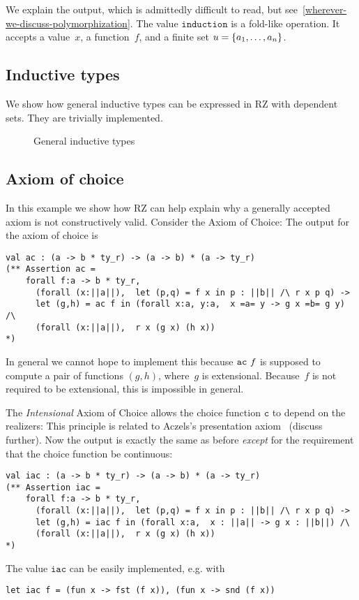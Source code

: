 %
We explain the output, which is admittedly difficult to read, but
see~\ref{wherever-we-discuss-polymorphization}. The value
$\mathtt{induction}$ is a fold-like operation. It accepts a value~$x$,
a function~$f$, and a finite set $u = \{a_1, \ldots, a_n\}$.



\subsection{Inductive types}
\label{sec:inductive-types}

We show how general inductive types can be expressed in RZ with
dependent sets. They are trivially implemented.

\begin{figure}
  \centering
  \caption{General inductive types}
  \label{fig:wtype}
\end{figure}

\subsection{Axiom of choice}
\label{sec:axiom-choice}

In this example we show how RZ can help explain why a generally
accepted axiom is not constructively valid. Consider the Axiom of
Choice:
%
%
The output for the axiom of choice is
%
\begin{verbatim}
val ac : (a -> b * ty_r) -> (a -> b) * (a -> ty_r)
(** Assertion ac =
    forall f:a -> b * ty_r,
      (forall (x:||a||),  let (p,q) = f x in p : ||b|| /\ r x p q) ->
      let (g,h) = ac f in (forall x:a, y:a,  x =a= y -> g x =b= g y) /\
      (forall (x:||a||),  r x (g x) (h x))
*)
\end{verbatim}
%
In general we cannot hope to implement this because
$\mathtt{ac}\ f$ is supposed to compute a pair of functions
$(g,h)$, where~$g$ is extensional. Because~$f$ is not required to be
extensional, this is impossible in general.

The \emph{Intensional} Axiom of Choice allows the choice function
$\mathtt{c}$ to depend on the realizers:
%
%
This principle is related to Aczels's presentation
axiom~\cite{aczel:presentation} (discuss further). Now the output is
exactly the same as before \emph{except} for the requirement that the
choice function be continuous:
%
\begin{verbatim}
val iac : (a -> b * ty_r) -> (a -> b) * (a -> ty_r)
(** Assertion iac =
    forall f:a -> b * ty_r,
      (forall (x:||a||),  let (p,q) = f x in p : ||b|| /\ r x p q) ->
      let (g,h) = iac f in (forall x:a,  x : ||a|| -> g x : ||b||) /\
      (forall (x:||a||),  r x (g x) (h x))
*)
\end{verbatim}
%
The value $\mathtt{iac}$ can be easily implemented, e.g. with
%
\begin{verbatim}
let iac f = (fun x -> fst (f x)), (fun x -> snd (f x))
\end{verbatim}

